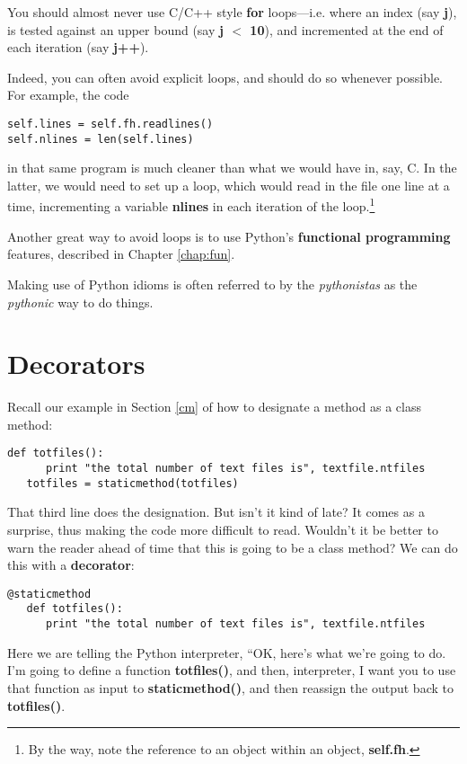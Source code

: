 You should almost never use C/C++ style {\bf for} loops---i.e. where an
index (say {\bf j}), is tested against an upper bound (say {\bf j $<$
10}), and incremented at the end of each iteration ({say \bf j++}).

Indeed, you can often avoid explicit loops, and should do so whenever
possible.  For example, the code

\begin{Verbatim}[fontsize=\relsize{-2}]
self.lines = self.fh.readlines()
self.nlines = len(self.lines)  
\end{Verbatim}

in that same program is much cleaner than what we would have in, say, C.
In the latter, we would need to set up a loop, which would read in the
file one line at a time, incrementing a variable {\bf nlines} in each
iteration of the loop.\footnote{By the way, note the reference to an
object within an object, {\bf self.fh}.}

Another great way to avoid loops is to use Python's {\bf functional
programming} features, described in Chapter \ref{chap:fun}.

Making use of Python idioms is often referred to by the {\it pythonistas}
as the {\it pythonic} way to do things.

\section{Decorators}
\label{decorators}

Recall our example in Section \ref{cm} of how to designate a method as a
class method:

\begin{Verbatim}[fontsize=\relsize{-2}]
   def totfiles():
      print "the total number of text files is", textfile.ntfiles
   totfiles = staticmethod(totfiles)
\end{Verbatim}

That third line does the designation.  But isn't it kind of late?  It
comes as a surprise, thus making the code more difficult to read.
Wouldn't it be better to warn the reader ahead of time that this is
going to be a class method?  We can do this with a {\bf decorator}:

\begin{Verbatim}[fontsize=\relsize{-2}]
   @staticmethod
   def totfiles():
      print "the total number of text files is", textfile.ntfiles
\end{Verbatim}

Here we are telling the Python interpreter, ``OK, here's what we're
going to do.  I'm going to define a function {\bf totfiles()}, and then,
interpreter, I want you to use that function as input to {\bf
staticmethod()}, and then reassign the output back to {\bf totfiles()}.

